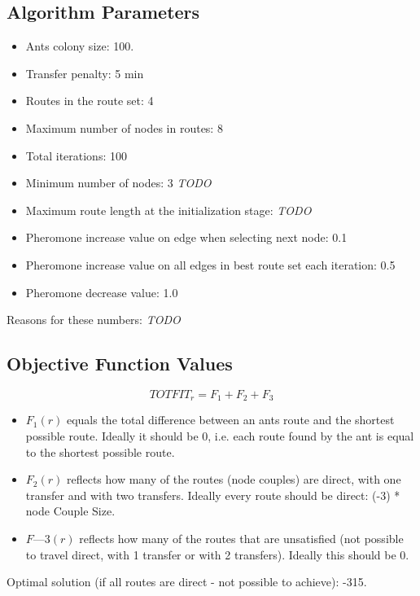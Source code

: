 \subsection{Algorithm Parameters}

\begin{itemize}
\item Ants colony size: 100.
\item Transfer penalty: 5 min
\item Routes in the route set: 4
\item Maximum number of nodes in routes: 8
\item Total iterations: 100
\item Minimum number of nodes: 3 \emph{\color{red} TODO}
\item Maximum route length at the initialization stage: \emph{\color{red} TODO}
\item Pheromone increase value on edge when selecting next node: 0.1
\item Pheromone increase value on all edges in best route set each iteration: 0.5
\item Pheromone decrease value: 1.0
\end{itemize}
Reasons for these numbers: \emph{\color{red} TODO}

\subsection{Objective Function Values}
$$TOTFIT_{r} = F_{1} + F_{2} + F_{3}$$
\begin{itemize}
\item $F_{1}(r)$ equals the total difference between an ants route and the shortest possible route. Ideally it should be 0, i.e. each route found by the ant is equal to the shortest possible route.
\item $F_{2}(r)$ reflects how many of the routes (node couples) are direct, with one transfer and with two transfers. Ideally every route should be direct: (-3) * node Couple Size. 
\item $F—{3}(r)$ reflects how many of the routes that are unsatisfied (not possible to travel direct, with 1 transfer or with 2 transfers). Ideally this should be 0.
\end{itemize}

Optimal solution (if all routes are direct - not possible to achieve): -315.